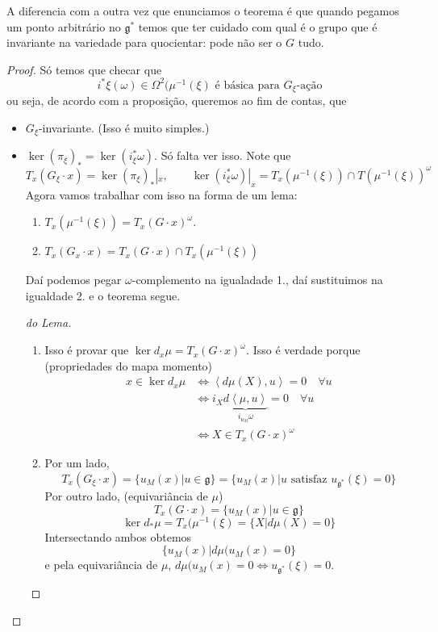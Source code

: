 \begin{remark}\leavevmode
	A diferencia com a outra vez que enunciamos o teorema é que quando pegamos um ponto arbitrário no $\mathfrak{g}^*$ temos que ter cuidado com qual é o grupo que é invariante na variedade para quocientar: pode não ser o $G$ tudo.
\end{remark}

\begin{proof}\leavevmode
	Só temos que checar que
	\[i^*\xi(\omega)\in\Omega^{2}(\mu^{-1}(\xi) \text{ é básica para $G_\xi$-ação} \]
	ou seja, de acordo com a proposição, queremos ao fim de contas, que
	\begin{itemize}
	\item $G_\xi$-invariante. (Isso é muito simples.)
	\item $\ker(\pi_\xi)_* =\ker(i^*_\xi\omega)$. Só falta ver isso. Note que
		\[T_x(G_\xi\cdot x)=\ker(\pi_\xi)_* |_{x},\qquad \ker(i_\xi^*\omega)|_{x}=T_x(\mu^{-1}(\xi))\cap T(\mu^{-1}(\xi))^\omega\]
		Agora vamos trabalhar com isso na forma de um lema:

	\begin{lemma}\leavevmode
		\begin{enumerate}
			\item $T_x(\mu^{-1}(\xi))=T_x(G\cdot x)^\omega$.
		
			\item $T_x(G_x\cdot x)=T_x(G\cdot x)\cap T_x(\mu^{-1}(\xi))$
		\end{enumerate}
	\end{lemma}
	Daí podemos pegar  $\omega$-complemento na igualadade 1., daí sustituimos na igualdade 2. e o teorema segue.

	\begin{proof}[do Lema]\leavevmode 
	\begin{enumerate}
		\item Isso é provar que $\ker d_x\mu=T_x(G\cdot x)^\omega$. Isso é verdade porque (propriedades do mapa momento)
			\begin{align*}
				x\in\ker d_x\mu&\iff \left<d \mu(X),u\right> =0\quad \forall u\\
				&\iff i_X \underbrace{d \left<\mu,u\right> }_{i_{u_M}\omega}=0\quad \forall u\\
				&\iff X\in T_x(G \cdot x)^\omega
			\end{align*}
		\item Por um lado,
			\[T_x(G_\xi\cdot x)=\{u_M(x)|u\in\mathfrak{g}\}=\{u_M(x)|u\text{ satisfaz }u_{\mathfrak{g}^*}(\xi)=0 \}\]
		Por outro lado, (equivariância de $\mu$)
		\[T_x(G\cdot x)=\{u_M(x)|u\in\mathfrak{g}\}\]
		\[\ker d_* \mu=T_x(\mu^{-1}(\xi)=\{X|d\mu(X)=0\}\]
		Intersectando ambos obtemos
		\[\{u_M(x)|d\mu(u_M(x)=0\}\]
		e pela equivariância de $\mu$, $d\mu(u_M(x)=0\iff u_{\mathfrak{g}^*}(\xi)=0$.
	\end{enumerate}
	\end{proof}
	\end{itemize}
\end{proof}


